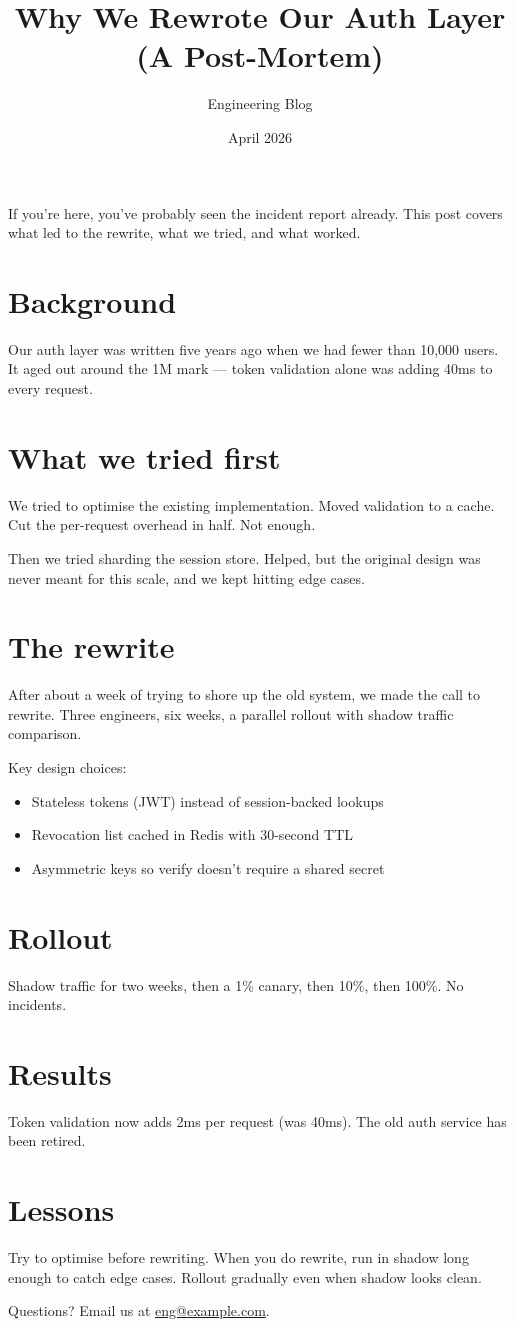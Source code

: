 \documentclass{article}
\title{Why We Rewrote Our Auth Layer (A Post-Mortem)}
\author{Engineering Blog}
\date{April 2026}
\begin{document}
\maketitle

If you're here, you've probably seen the incident report already. This post covers what led to the rewrite, what we tried, and what worked.

\section*{Background}
Our auth layer was written five years ago when we had fewer than 10{,}000 users. It aged out around the 1M mark --- token validation alone was adding 40ms to every request.

\section*{What we tried first}
We tried to optimise the existing implementation. Moved validation to a cache. Cut the per-request overhead in half. Not enough.

Then we tried sharding the session store. Helped, but the original design was never meant for this scale, and we kept hitting edge cases.

\section*{The rewrite}
After about a week of trying to shore up the old system, we made the call to rewrite. Three engineers, six weeks, a parallel rollout with shadow traffic comparison.

Key design choices:
\begin{itemize}
  \item Stateless tokens (JWT) instead of session-backed lookups
  \item Revocation list cached in Redis with 30-second TTL
  \item Asymmetric keys so verify doesn't require a shared secret
\end{itemize}

\section*{Rollout}
Shadow traffic for two weeks, then a 1\% canary, then 10\%, then 100\%. No incidents.

\section*{Results}
Token validation now adds 2ms per request (was 40ms). The old auth service has been retired.

\section*{Lessons}
Try to optimise before rewriting. When you do rewrite, run in shadow long enough to catch edge cases. Rollout gradually even when shadow looks clean.

Questions? Email us at \href{mailto:eng@example.com}{eng@example.com}.
\end{document}
